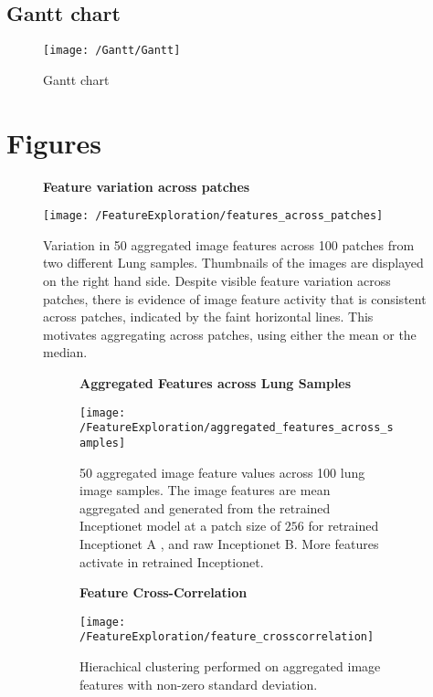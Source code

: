 \documentclass[graybox]{svmult}
\newcommand*{\figuretitle}[1]{%
    {\centering%
    \textbf{#1}%
    \par\medskip}%
}
\begin{document}
\subsection{Gantt chart}



\begin{figure}[H]
\centering
\texttt{[image: /Gantt/Gantt]}
\caption{Gantt chart}
\label{fig:gantt}
\end{figure}


\section{Figures}

\begin{figure}[H]
\figuretitle{Feature variation across patches}
\centering
\texttt{[image: /FeatureExploration/features\_across\_patches]}
\caption{Variation in 50 aggregated image features across 100 patches from two different Lung samples. Thumbnails of the images are displayed on the right hand side. Despite visible feature variation across patches, there is evidence of image feature activity that is consistent across patches, indicated by the faint horizontal lines. This motivates aggregating across patches, using either the mean or the median.}
\label{fig:features_across_patches}
\end{figure}

\begin{figure}[H]

\begin{subfigure}{0.45\textwidth}
\figuretitle{Aggregated Features across Lung Samples}
\texttt{[image: /FeatureExploration/aggregated\_features\_across\_samples]} 
\caption{50 aggregated image feature values across 100 lung image samples. The image features are mean aggregated and generated from the retrained Inceptionet model at a patch size of $256$ for retrained Inceptionet \textcolor{ao(english)}{A} , and raw Inceptionet \textcolor{ao(english)}{B}. More features activate in retrained Inceptionet.}
\label{fig:aggregated_features_across_samples}
\end{subfigure}
\hfill
\begin{subfigure}{0.45\textwidth}
\figuretitle{Feature Cross-Correlation}
\texttt{[image: /FeatureExploration/feature\_crosscorrelation]}
\caption{Hierachical clustering performed on aggregated image features with non-zero standard deviation.}
\label{fig:feature_crosscorrelation}
\end{subfigure}

\caption{ }

\end{figure}
\end{document}
